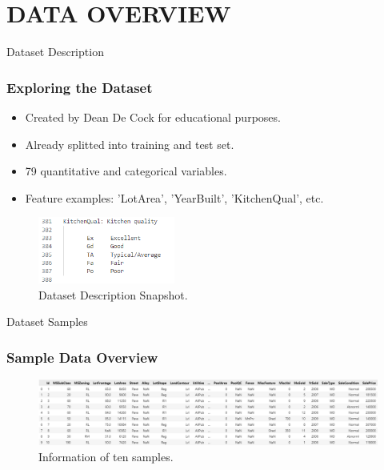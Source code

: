 \section{DATA OVERVIEW}
\label{data_overview_section}


\begin{frame}{Dataset Description}
    \frametitle{Exploring the Dataset}
    \begin{itemize}
        \item Created by Dean De Cock for educational purposes.
        \item Already splitted into training and test set.
        \item 79 quantitative and categorical variables.
        \item Feature examples: 'LotArea', 'YearBuilt', 'KitchenQual', etc.
    \end{itemize}
    \vspace{0.5cm}
    \begin{figure}
        \includegraphics[width=0.4\textwidth]{figures/data_description.png} 
        \caption{Dataset Description Snapshot.}
        \label{fig:dataset_description_snapshot}
    \end{figure}
\end{frame}

\begin{frame}{Dataset Samples}
    \frametitle{Sample Data Overview}
    \begin{figure}
        \includegraphics[width=1\textwidth]{figures/data_head.png} 
        \caption{Information of ten samples.}
        \label{fig:dataset_head}
    \end{figure}
\end{frame}

